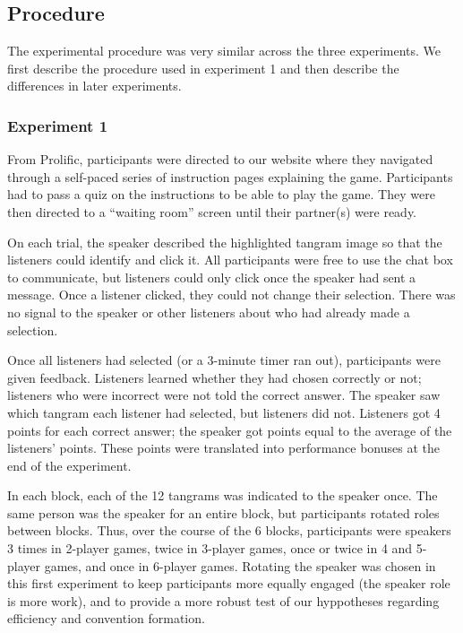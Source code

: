 \documentclass[
  english,
]{article}
\begin{document}
\hypertarget{procedure}{%
\subsection{Procedure}\label{procedure}}

The experimental procedure was very similar across the three experiments. We first describe the procedure used in experiment 1 and then describe the differences in later experiments.

\hypertarget{experiment-1}{%
\subsubsection{Experiment 1}\label{experiment-1}}

From Prolific, participants were directed to our website where they navigated through a self-paced series of instruction pages explaining the game. Participants had to pass a quiz on the instructions to be able to play the game. They were then directed to a ``waiting room'' screen until their partner(s) were ready.

On each trial, the speaker described the highlighted tangram image so that the listeners could identify and click it. All participants were free to use the chat box to communicate, but listeners could only click once the speaker had sent a message. Once a listener clicked, they could not change their selection. There was no signal to the speaker or other listeners about who had already made a selection.

Once all listeners had selected (or a 3-minute timer ran out), participants were given feedback. Listeners learned whether they had chosen correctly or not; listeners who were incorrect were not told the correct answer. The speaker saw which tangram each listener had selected, but listeners did not. Listeners got 4 points for each correct answer; the speaker got points equal to the average of the listeners' points. These points were translated into performance bonuses at the end of the experiment.

In each block, each of the 12 tangrams was indicated to the speaker once. The same person was the speaker for an entire block, but participants rotated roles between blocks. Thus, over the course of the 6 blocks, participants were speakers 3 times in 2-player games, twice in 3-player games, once or twice in 4 and 5-player games, and once in 6-player games. Rotating the speaker was chosen in this first experiment to keep participants more equally engaged (the speaker role is more work), and to provide a more robust test of our hyppotheses regarding efficiency and convention formation.
\end{document}
